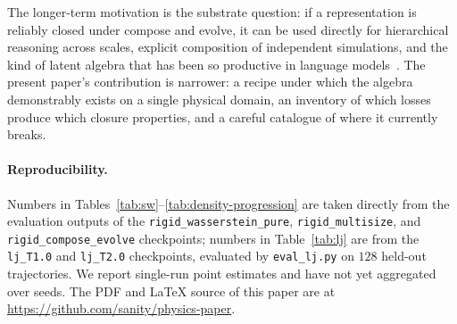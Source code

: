 \documentclass[11pt]{article}
\begin{document}
The longer-term motivation is the substrate question: if a representation is reliably closed under compose and evolve, it can be used directly for hierarchical reasoning across scales, explicit composition of independent simulations, and the kind of latent algebra that has been so productive in language models~\cite{mikolov2013word2vec, kaplan2020scaling}. The present paper's contribution is narrower: a recipe under which the algebra demonstrably exists on a single physical domain, an inventory of which losses produce which closure properties, and a careful catalogue of where it currently breaks.

\paragraph{Reproducibility.} Numbers in Tables~\ref{tab:sw}--\ref{tab:density-progression} are taken directly from the evaluation outputs of the \texttt{rigid\_wasserstein\_pure}, \texttt{rigid\_multisize}, and \texttt{rigid\_compose\_evolve} checkpoints; numbers in Table~\ref{tab:lj} are from the \texttt{lj\_T1.0} and \texttt{lj\_T2.0} checkpoints, evaluated by \texttt{eval\_lj.py} on $128$ held-out trajectories. We report single-run point estimates and have not yet aggregated over seeds. The PDF and \LaTeX{} source of this paper are at \url{https://github.com/sanity/physics-paper}.
\end{document}
